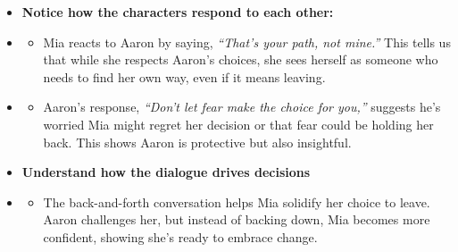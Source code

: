 \documentclass[12pt]{article}
\begin{document}
\begin{tcolorbox}[colframe=black!60, colback=white, 
coltitle=black, colbacktitle=black!15, fonttitle=\bfseries\Large, 
title=Examples, halign title=center, left=10pt, right=10pt, top=10pt, bottom=15pt]
\begin{itemize}
    \item \textbf{Notice how the characters respond to each other:}
\end{itemize}
    \begin{itemize}
       \item 
       \begin{itemize}
            \item Mia reacts to Aaron by saying, \textit{“That’s your path, not mine.”} This tells us that while she respects Aaron’s choices, she sees herself as someone who needs to find her own way, even if it means leaving.
        \end{itemize}
    \end{itemize}
\begin{itemize}
    \item
        \begin{itemize}
            \item Aaron’s response, \textit{“Don’t let fear make the choice for you,”} suggests he’s worried Mia might regret her decision or that fear could be holding her back. This shows Aaron is protective but also insightful.
        \end{itemize}
    \end{itemize}


    \begin{itemize}
        \item \textbf{Understand how the dialogue drives decisions}
         
\end{itemize}
\begin{itemize}
\item
    \begin{itemize}
        \item The back-and-forth conversation helps Mia solidify her choice to leave. Aaron challenges her, but instead of backing down, Mia becomes more confident, showing she’s ready to embrace change.
    \end{itemize}
 
\end{itemize}
 





     \end{tcolorbox}
\vspace{1em}
\end{document}
